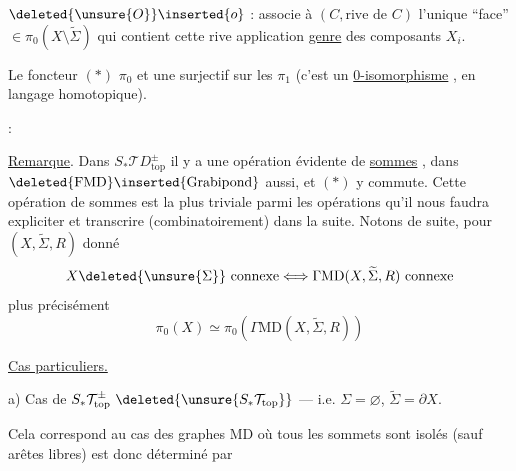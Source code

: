 $\deleted{\unsure{O}}\inserted{o}$ : associe à $(C,\text{rive de }C)$
l'unique ``face'' $\in\pi_0(X\setminus\widetilde\Sigma)$ qui
contient cette rive 
application \uline{genre} des composants $X_i$.

Le foncteur $(*)$ 
 $\pi_0$ et une surjectif
sur les $\pi_1$ (c'est un \uline{0-isomorphisme} ,
en langage homotopique).

 :

\uline{Remarque}. Dans $S_*\mathcal TD^\pm_{\mathrm{top}}$ il y a une
opération évidente de \uline{sommes} ,
dans $\deleted{\mathrm{FMD}}\inserted{\mathrm{Grabipond}}$ aussi,
et $(*)$ y commute.
Cette opération de sommes est la plus triviale parmi les opérations qu'il
nous faudra expliciter et transcrire (combinatoirement) dans la suite.
Notons de suite, pour $(X,\widetilde\Sigma,R)$ donné
\[
X\deleted{\unsure{\Sigma}}\text{ connexe}\Longleftrightarrow
\Gamma\mathrm{MD}(X,\widetilde\Sigma,R)\text{ connexe}
\]
plus précisément
\[
\pi_0(X)\simeq\pi_0(\Gamma\mathrm{MD}(X,\widetilde\Sigma,R))
\]

\uline{Cas particuliers.}

a) Cas de $S_*\mathcal T^\pm_{\mathrm{top}}\
\deleted{\unsure{S_*\mathcal T_{\mathrm{top}}}}$
--- i.e. $\Sigma=\varnothing$, $\widetilde\Sigma=\partial X$.

Cela correspond au cas des graphes MD  où
tous les sommets sont isolés (sauf arêtes libres)
  est donc déterminé par

